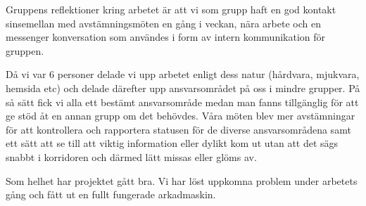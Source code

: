 \documentclass[12pt,fleqn,openany]{book} %
\begin{document}
Gruppens reflektioner kring arbetet är att vi som grupp haft en god kontakt sinsemellan med avstämningsmöten en gång i veckan, nära 
arbete och en messenger konversation som användes i form av intern kommunikation för gruppen.

Då vi var 6 personer delade vi upp arbetet enligt dess natur (hårdvara, mjukvara, hemsida etc) och delade därefter upp ansvarsområdet 
på oss i mindre grupper. På så sätt fick vi alla ett bestämt ansvarsområde medan man fanns tillgänglig för att ge stöd åt en annan 
grupp om det behövdes. Våra möten blev mer avstämningar för att kontrollera och rapportera statusen för de diverse ansvarsområdena 
samt ett sätt att se till att viktig information eller dylikt kom ut utan att det sägs snabbt i korridoren och därmed lätt missas 
eller glöms av.

Som helhet har projektet gått bra. Vi har löst uppkomna problem under arbetets gång och fått ut en fullt fungerade arkadmaskin. 
\end{document}
